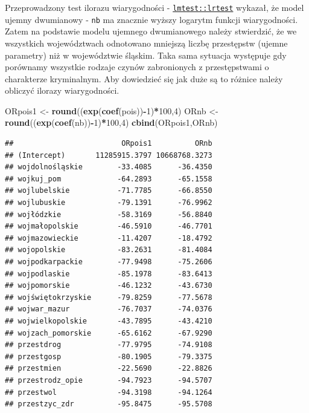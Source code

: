 \documentclass[polish,]{book}
\newenvironment{Shaded}{\begin{snugshade}}{\end{snugshade}}
\newcommand{\DecValTok}[1]{\textcolor[rgb]{0.00,0.00,0.81}{#1}}
\newcommand{\KeywordTok}[1]{\textcolor[rgb]{0.13,0.29,0.53}{\textbf{#1}}}
\newcommand{\NormalTok}[1]{#1}
\newcommand{\OperatorTok}[1]{\textcolor[rgb]{0.81,0.36,0.00}{\textbf{#1}}}
\newcommand{\StringTok}[1]{\textcolor[rgb]{0.31,0.60,0.02}{#1}}
\begin{document}
Przeprowadzony test ilorazu wiarygodności - \href{https://rdrr.io/cran/lmtest/man/lrtest.html}{\texttt{lmtest::lrtest}} wykazał, że model
ujemny dwumianowy - \texttt{nb} ma znacznie wyższy logarytm funkcji wiarygodności. Zatem na podstawie modelu ujemnego dwumianowego należy stwierdzić, że we wszystkich województwach odnotowano mniejszą liczbę przestępstw (ujemne parametry)
niż w województwie śląskim. Taka sama sytuacja występuje gdy porównamy wszystkie rodzaje czynów zabronionych z przestępstwami o charakterze kryminalnym. Aby
dowiedzieć się jak duże są to różnice należy obliczyć ilorazy wiarygodności.

\begin{Shaded}
\begin{Highlighting}[]
\NormalTok{ORpois1 <-}\StringTok{ }\KeywordTok{round}\NormalTok{((}\KeywordTok{exp}\NormalTok{(}\KeywordTok{coef}\NormalTok{(pois))}\OperatorTok{-}\DecValTok{1}\NormalTok{)}\OperatorTok{*}\DecValTok{100}\NormalTok{,}\DecValTok{4}\NormalTok{)}
\NormalTok{ORnb <-}\StringTok{ }\KeywordTok{round}\NormalTok{((}\KeywordTok{exp}\NormalTok{(}\KeywordTok{coef}\NormalTok{(nb))}\OperatorTok{-}\DecValTok{1}\NormalTok{)}\OperatorTok{*}\DecValTok{100}\NormalTok{,}\DecValTok{4}\NormalTok{)}
\KeywordTok{cbind}\NormalTok{(ORpois1,ORnb)}
\end{Highlighting}
\end{Shaded}

\begin{verbatim}
##                         ORpois1          ORnb
## (Intercept)       11285915.3797 10668768.3273
## wojdolnośląskie        -33.4085      -36.4350
## wojkuj_pom             -64.2893      -65.1558
## wojlubelskie           -71.7785      -66.8550
## wojlubuskie            -79.1391      -76.9962
## wojłódzkie             -58.3169      -56.8840
## wojmałopolskie         -46.5910      -46.7701
## wojmazowieckie         -11.4207      -18.4792
## wojopolskie            -83.2631      -81.4084
## wojpodkarpackie        -77.9498      -75.2606
## wojpodlaskie           -85.1978      -83.6413
## wojpomorskie           -46.1232      -43.6730
## wojświętokrzyskie      -79.8259      -77.5678
## wojwar_mazur           -76.7037      -74.0376
## wojwielkopolskie       -43.7895      -43.4210
## wojzach_pomorskie      -65.6162      -67.9290
## przestdrog             -77.9795      -74.9108
## przestgosp             -80.1905      -79.3375
## przestmien             -22.5690      -22.8826
## przestrodz_opie        -94.7923      -94.5707
## przestwol              -94.3198      -94.1264
## przestzyc_zdr          -95.8475      -95.5708
\end{verbatim}
\end{document}
